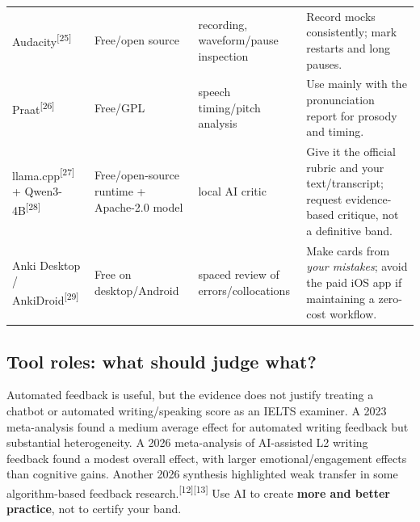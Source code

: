 \documentclass[11pt,a4paper]{article}
\newcommand{\src}[1]{\textsuperscript{[#1]}}
\begin{document}
\begin{longtable}{p{3.2cm}p{2.3cm}p{4.2cm}p{5.2cm}}
Audacity\src{25} & Free/open source & recording, waveform/pause inspection & Record mocks consistently; mark restarts and long pauses. \\
Praat\src{26} & Free/GPL & speech timing/pitch analysis & Use mainly with the pronunciation report for prosody and timing. \\
llama.cpp\src{27} + Qwen3-4B\src{28} & Free/open-source runtime + Apache-2.0 model & local AI critic & Give it the official rubric and your text/transcript; request evidence-based critique, not a definitive band. \\
Anki Desktop / AnkiDroid\src{29} & Free on desktop/Android & spaced review of errors/collocations & Make cards from \emph{your mistakes}; avoid the paid iOS app if maintaining a zero-cost workflow. \\
\bottomrule
\end{longtable}

\subsection{Tool roles: what should judge what?}
\begin{center}
\end{center}

\begin{warningbox}
Automated feedback is useful, but the evidence does not justify treating a chatbot or automated writing/speaking score as an IELTS examiner. A 2023 meta-analysis found a medium average effect for automated writing feedback but substantial heterogeneity. A 2026 meta-analysis of AI-assisted L2 writing feedback found a modest overall effect, with larger emotional/engagement effects than cognitive gains. Another 2026 synthesis highlighted weak transfer in some algorithm-based feedback research.\src{12}\src{13} Use AI to create \textbf{more and better practice}, not to certify your band.
\end{warningbox}
\end{document}
